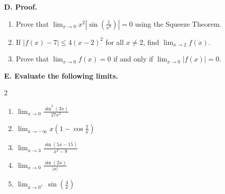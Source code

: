 \medskip
\noindent\textbf{D. Proof.}
\begin{enumerate}
    \setlength{\itemsep}{3pt}
    \setlength{\parsep}{0pt}
    \setlength{\topsep}{2pt}
    \setcounter{enumi}{17}
    \item Prove that \(\displaystyle \lim_{x \to 0} x^{2} \left|\sin\!\left(\frac{1}{x^{3}}\right)\right| = 0\) using the Squeeze Theorem.
    \item If \(|f(x) - 7| \leq 4(x - 2)^{2}\) for all \(x \neq 2\), find \(\displaystyle \lim_{x \to 2} f(x)\).
    \item Prove that \(\displaystyle \lim_{x \to 0} f(x) = 0\) if and only if \(\displaystyle \lim_{x \to 0} |f(x)| = 0\).
\end{enumerate}

\medskip
\noindent\textbf{E. Evaluate the following limits.}
\begin{multicols}{2}
\begin{enumerate}
    \setlength{\itemsep}{3pt}
    \setlength{\parsep}{0pt}
    \setlength{\topsep}{2pt}
    \setcounter{enumi}{20}
    \item \(\displaystyle \lim_{x \to 0} \frac{\sin^{3}(3x)}{27x^{3}}\)
    \item \(\displaystyle \lim_{x \to -\infty} x\!\left(1 - \cos\frac{2}{x}\right)\)
    \item \(\displaystyle \lim_{x \to 3} \frac{\sin(5x - 15)}{x^{2} - 9}\)
    \item \(\displaystyle \lim_{x \to 0} \frac{\sin(2x)}{|x|}\)
    \item \(\displaystyle \lim_{x \to 0^{+}} \sin\!\left(\frac{4}{x}\right)\)
\end{enumerate}
\end{multicols}